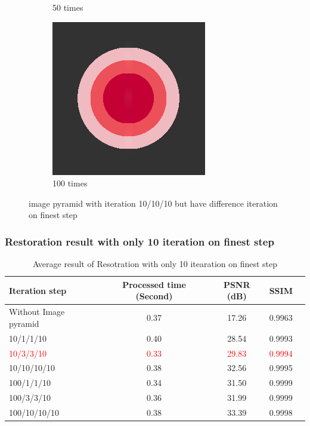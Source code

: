 \documentclass[xcolor=dvipsnames, xetex,serif]{beamer}
\begin{document}
\begin{frame}
\begin{figure}[H]
\begin{subfigure}{0.4\linewidth}
                \caption{50 times}
            \end{subfigure}
            \begin{subfigure}{0.4\linewidth}
                \centering
                \includegraphics[width=0.6\linewidth]{images/just10enough/only100time.png}			
                \caption{100 times}
            \end{subfigure}
            \caption{{\footnotesize image pyramid with iteration 10/10/10 but have difference iteration on finest step}}
        \end{figure}
    \end{frame}
    \begin{frame}
        \frametitle{Restoration result with only 10 iteration on finest step}
        \begin{table}[H]
            \centering
            \begin{tabular}[ht]{|l|c|c|c|c|}
                \hline
                Iteration step  & Processed time  (Second) & PSNR (dB) & SSIM \\
                \hline
                Without Image pyramid & 0.37 & 17.26 & 0.9963  \\
                10/1/1/10 & 0.40 & 28.54 & 0.9993 \\
                \textcolor{red}{10/3/3/10} & \textcolor{red}{0.33} & \textcolor{red}{29.83}  & \textcolor{red}{0.9994} \\
                10/10/10/10 & 0.38 & 32.56 & 0.9995 \\
                100/1/1/10 & 0.34 & 31.50 & 0.9999 \\
                100/3/3/10 & 0.36 & 31.99 & 0.9999 \\
                100/10/10/10 & 0.38 & 33.39 & 0.9998 \\
                \hline
            \end{tabular}
            \caption{{\small Average result of Resotration with only 10 itearation on finest step}}
        \end{table}	
    \end{frame}
\end{document}
